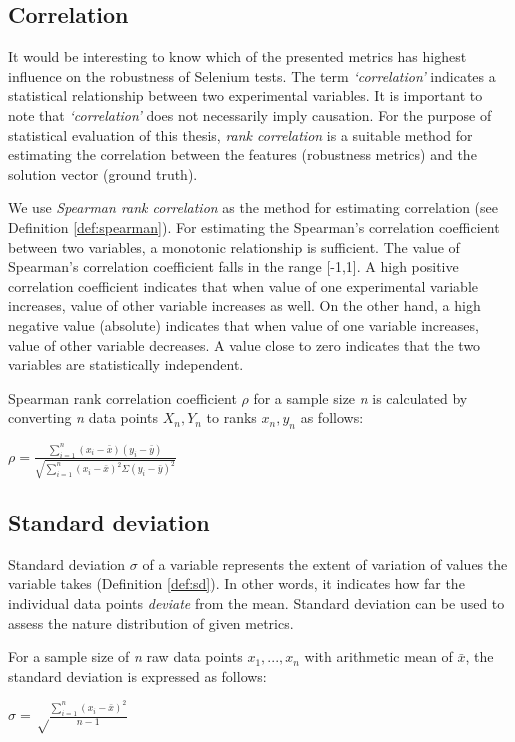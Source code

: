 \subsection*{Correlation}
It would be interesting to know which of the presented metrics has highest influence on the robustness of Selenium tests. The term \textit{`correlation'} indicates a statistical relationship between two experimental variables. It is important to note that \textit{`correlation'} does not necessarily imply causation. For the  purpose of statistical evaluation of this thesis, \textit{rank correlation} is a suitable method for estimating the correlation between the features (robustness metrics) and the solution vector (ground truth).

We use \textit{Spearman rank correlation} as the method for estimating correlation (see Definition \ref{def:spearman}). For estimating the Spearman's correlation coefficient between two variables, a monotonic relationship is sufficient. The value of Spearman's correlation coefficient falls in the range [-1,1]. A high positive correlation coefficient indicates that when value of one experimental variable increases, value of other variable increases as well. On the other hand, a high negative value (absolute) indicates that when value of one variable increases, value of other variable decreases. A value close to zero indicates that the two variables are statistically independent. 
\theoremstyle{definition}
\begin{definition}{Spearman rank correlation coefficient $\rho$ for a sample size \textit{n} is calculated by converting \textit{n} data points \textit{$X_n,Y_n$} to ranks \textit{$x_n,y_n$} as follows:}

\begin{center}\Large
$\rho = \frac{\sum\limits_{i=1}^{n}(x_i - \bar{x})(y_i - \bar{y})}{\sqrt{\sum\limits_{i=1}^{n}(x_i - \bar{x})^2\Sigma(y_i - \bar{y})^2}}$
\end{center}
\label{def:spearman}
\end{definition}

\subsection*{Standard deviation}
Standard deviation $\sigma$ of a variable represents the extent of variation of values the variable takes (Definition \ref{def:sd}). In other words, it indicates how far the individual data points \textit{deviate} from the mean. Standard deviation can be used to assess the nature distribution of given metrics. 
\theoremstyle{definition}
\begin{definition}{For a sample size of \textit{n} raw data points \textit{$x_1,...,x_n$} with arithmetic mean of $\bar{x}$, the standard deviation is expressed as follows:  }
\begin{center}\Large
$\sigma = \sqrt\frac{\sum\limits_{i=1}^{n}(x_i - \bar{x})^2} {n - 1}$
\label{def:sd}
\end{center}
\end{definition}

